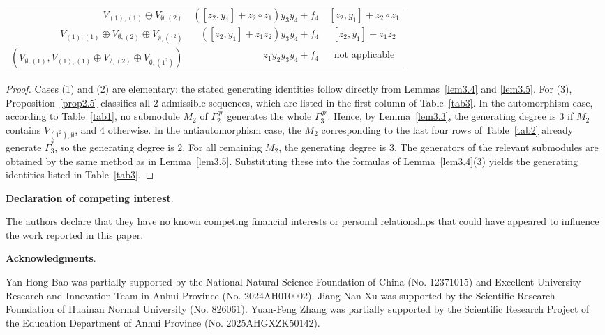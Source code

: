 \documentclass{amsart}
\theoremstyle{definition}
\theoremstyle{remark}
\numberwithin{equation}{section}
\def \Ga{\Gamma}
\def \es{\emptyset}
\begin{document}
\begin{table}[H]
\begin{tabular}{rrr}
		$V_{(1),(1)} \oplus V_{\es,(2)}$   		&$([z_2,y_1]+z_2 \circ z_1)y_3y_4 + f_4$ &\multicolumn{1}{c}{$[z_2,y_1]+z_2 \circ z_1$}   \\ 
		$V_{(1),(1)} \oplus V_{\es,(2)} \oplus V_{\es,(1^2)}$ &$([z_2,y_1]+z_1z_2)y_3y_4 + f_4$ &\multicolumn{1}{c}{$[z_2,y_1]+z_1z_2$}  \\ 
		$(V_{\es,(1)}, V_{(1),(1)} \oplus V_{\es,(2)} \oplus V_{\es,(1^2)})$  &$z_1y_2y_3y_4 + f_4$ &\multicolumn{1}{c}{not applicable}   \\ 
		\hline		
	\end{tabular}
\end{table}

\begin{proof}
	Cases (1) and (2) are elementary: the stated generating identities follow directly from Lemmas~\ref{lem3.4} and \ref{lem3.5}. For (3), Proposition~\ref{prop2.5} classifies all $2$-admissible sequences, which are listed in the first column of Table~\ref{tab3}. In the automorphism case, according to Table~\ref{tab1}, no submodule $M_2$ of $\Ga_2^{gr}$ generates the whole $\Ga_3^{gr}$. Hence, by Lemma~\ref{lem3.3}, the generating degree is $3$ if $M_2$ contains $V_{(1^2),\emptyset}$, and $4$ otherwise. In the antiautomorphism case, the $M_2$ corresponding to the last four rows of Table~\ref{tab2} already generate $\Ga_3^*$, so the generating degree is $2$. For all remaining $M_2$, the generating degree is $3$. The generators of the relevant submodules are obtained by the same method as in Lemma~\ref{lem3.5}. Substituting these into the formulas of Lemma~\ref{lem3.4}(3) yields the generating identities listed in Table~\ref{tab3}.
\end{proof}	
	
	

\noindent \textbf{Declaration of competing interest}.

	The authors declare that they have no known competing financial interests or personal relationships that could have appeared to influence the work reported in this paper.



\noindent\textbf{Acknowledgments}.

	Yan-Hong Bao was partially supported by the National Natural Science Foundation of China (No. 12371015) and Excellent University Research and Innovation Team in Anhui Province (No. 2024AH010002). Jiang-Nan Xu was supported by the Scientific Research Foundation of Huainan Normal University (No. 826061). Yuan-Feng Zhang was partially supported by the Scientific Research Project of the Education Department of Anhui Province (No. 2025AHGXZK50142).
	
\end{document}
